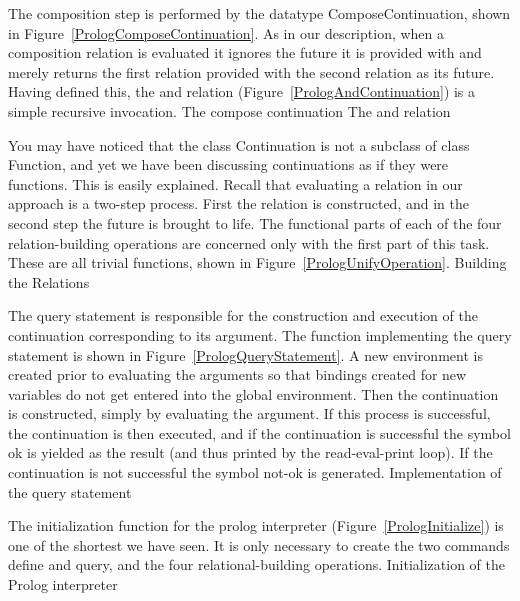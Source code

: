 The composition step is performed by the datatype {\sf ComposeContinuation},
shown in Figure~\ref{PrologComposeContinuation}.  As in our description, when a
composition relation is evaluated it ignores the future it is provided with and
merely returns the first relation provided with the second relation as its
future.  Having defined this, the {\sf and} relation
(Figure~\ref{PrologAndContinuation}) is a simple recursive invocation.
%
{The {\sf compose} continuation}
%
{The {\sf and} relation}

You may have noticed that the class {\sf Continuation} is not a subclass of
class {\sf Function}, and yet we have been discussing continuations as if they
were functions.  This is easily explained.  Recall that evaluating a relation in
our approach is a two-step process.  First the relation is constructed, and in
the second step the future is brought to life.  The functional parts of each of
the four relation-building operations are concerned only with the first part of
this task.  These are all trivial functions, shown in
Figure~\ref{PrologUnifyOperation}.
%
{Building the Relations}

The {\sf query} statement is responsible for the construction and execution of
the continuation corresponding to its argument.  The function implementing the
{\sf query} statement is shown in Figure~\ref{PrologQueryStatement}.  A new
environment is created prior to evaluating the arguments so that bindings
created for new variables do not get entered into the global environment.  Then
the continuation is constructed, simply by evaluating the argument.  If this
process is successful, the continuation is then executed, and if the
continuation is successful the symbol {\sf ok} is yielded as the result (and
thus printed by the read-eval-print loop).  If the continuation is not
successful the symbol {\sf not-ok} is generated.
%
{Implementation of the query statement}

The initialization function for the prolog interpreter
(Figure~\ref{PrologInitialize}) is one of the shortest we have seen.  It is only
necessary to create the two commands {\sf define} and {\sf query}, and the four
relational-building operations.
%
{Initialization of the Prolog interpreter}
